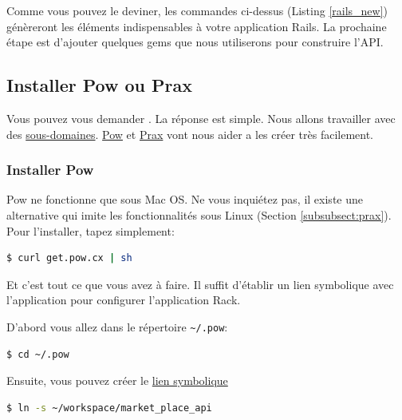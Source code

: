 \documentclass[]{report}
\begin{document}
    Comme vous pouvez le deviner, les commandes ci-dessus (Listing \ref{rails_new}) génèreront les éléments indispensables à votre application Rails. La prochaine étape est d'ajouter quelques gems que nous utiliserons pour construire l'API.

    \subsection{Installer Pow ou Prax}\label{subsection:install_pow}

      Vous pouvez vous demander . La réponse est simple. Nous allons travailler avec des \href{http://en.wikipedia.org/wiki/Subdomain}{sous-domaines}. \href{http://pow.cx/}{Pow} et \href{https://github.com/ysbaddaden/prax.cr}{Prax} vont nous aider a les créer très facilement.

      \subsubsection{Installer Pow}

        Pow ne fonctionne que sous Mac OS. Ne vous inquiétez pas, il existe une alternative qui imite les fonctionnalités sous Linux (Section \ref{subsubsect:prax}). Pour l'installer, tapez simplement:

        \begin{scriptsize}
        \begin{lstlisting}[language=bash]
        $ curl get.pow.cx | sh
        \end{lstlisting}
        \end{scriptsize}

        Et c'est tout ce que vous avez à faire. Il suffit d'établir un lien symbolique avec l'application pour configurer l'application Rack.

        D'abord vous allez dans le répertoire \verb|~/.pow|:

        \begin{scriptsize}
        \begin{lstlisting}[language=bash]
        $ cd ~/.pow
        \end{lstlisting}
        \end{scriptsize}

        Ensuite, vous pouvez créer le \href{http://en.wikipedia.org/wiki/Symbolic_link}{lien symbolique}

        \begin{scriptsize}
        \begin{lstlisting}[language=bash]
        $ ln -s ~/workspace/market_place_api
        \end{lstlisting}
        \end{scriptsize}
\end{document}
